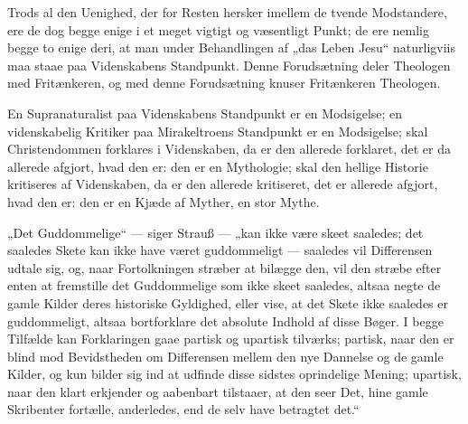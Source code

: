 \documentclass[12pt,a4paper]{book}
\newcommand{\opage}[1]{\marginnote{\footnotesize\textit{[#1]}}}
\begin{document}
Trods al den Uenighed, der for Resten hersker imellem de tvende
Modstandere, ere de dog begge enige i et meget vigtigt og væsentligt
Punkt; de ere nemlig begge to enige deri, at man under Behandlingen af
„das Leben Jesu“ naturligviis maa staae paa Videnskabens Standpunkt.
Denne Forudsætning deler Theologen med Fritænkeren, og med denne
Forudsætning knuser Fritænkeren Theologen.

En Supranaturalist paa Videnskabens Standpunkt er en Modsigelse; en
videnskabelig Kritiker paa Mirakeltroens Standpunkt er en Modsigelse;
skal Christendommen forklares i Videnskaben, da er den allerede forklaret,
det er da allerede afgjort, hvad den er: den er en Mythologie; skal den
hellige Historie kritiseres af Videnskaben, da er den allerede
kritiseret, det er allerede afgjort, hvad den er: den er en Kjæde af
Myther, en stor Mythe.

„Det Guddommelige“ --- siger Strauß --- „kan ikke være skeet saaledes;
det saaledes Skete kan ikke have været guddommeligt --- saaledes vil
Differensen udtale sig, og, naar Fortolkningen stræber at bilægge den,
vil den stræbe efter enten at fremstille det Guddommelige som ikke skeet
saaledes, altsaa negte de gamle Kilder deres historiske Gyldighed, eller
vise, at det Skete
\opage{84} ikke saaledes er guddommeligt, altsaa bortforklare det absolute Indhold
af disse Bøger. I begge Tilfælde kan Forklaringen gaae partisk og
upartisk tilværks; partisk, naar den er blind mod Bevidstheden om
Differensen mellem den nye Dannelse og de gamle Kilder, og kun bilder sig
ind at udfinde disse sidstes oprindelige Mening; upartisk, naar den klart
erkjender og aabenbart tilstaaer, at den seer Det, hine gamle Skribenter
fortælle, anderledes, end de selv have betragtet det.“
\end{document}

